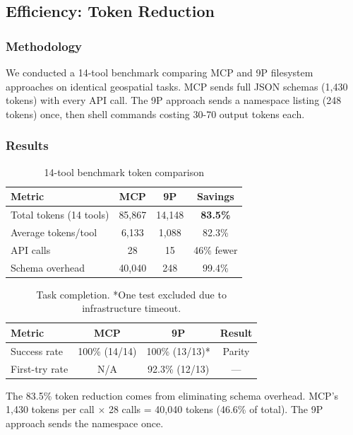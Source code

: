 \documentclass{article}
\begin{document}
\subsection{Efficiency: Token Reduction}

\subsubsection{Methodology}

We conducted a 14-tool benchmark comparing MCP and 9P filesystem approaches on identical geospatial tasks. MCP sends full JSON schemas (1,430 tokens) with every API call. The 9P approach sends a namespace listing (248 tokens) once, then shell commands costing 30-70 output tokens each.

\subsubsection{Results}

\begin{table}[h]
\centering
\begin{tabular}{lccc}
\hline
\textbf{Metric} & \textbf{MCP} & \textbf{9P} & \textbf{Savings} \\
\hline
Total tokens (14 tools) & 85,867 & 14,148 & \textbf{83.5\%} \\
Average tokens/tool & 6,133 & 1,088 & 82.3\% \\
API calls & 28 & 15 & 46\% fewer \\
Schema overhead & 40,040 & 248 & 99.4\% \\
\hline
\end{tabular}
\caption{14-tool benchmark token comparison}
\label{tab:tokens}
\end{table}

\begin{table}[h]
\centering
\begin{tabular}{lccc}
\hline
\textbf{Metric} & \textbf{MCP} & \textbf{9P} & \textbf{Result} \\
\hline
Success rate & 100\% (14/14) & 100\% (13/13)* & Parity \\
First-try rate & N/A & 92.3\% (12/13) & --- \\
\hline
\end{tabular}
\caption{Task completion. *One test excluded due to infrastructure timeout.}
\label{tab:success}
\end{table}

The 83.5\% token reduction comes from eliminating schema overhead. MCP's 1,430 tokens per call $\times$ 28 calls = 40,040 tokens (46.6\% of total). The 9P approach sends the namespace once.
\end{document}

